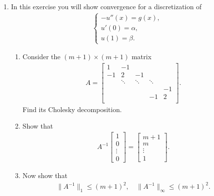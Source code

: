 \documentclass[10pt]{amsart}
\begin{document}
\mline
\begin{enumerate}[label={\bf Problem~{\arabic*}:}]
\item In this exercise you will show convergence for a discretization of
  \begin{align*}
    \begin{cases}
      -u''(x) = g(x),\\
      u'(0) = \alpha,\\
      u(1) = \beta.
    \end{cases}
  \end{align*}
  \begin{enumerate}
\item  Consider the $(m+1) \times (m+1)$ matrix
  \begin{align*}
    A = \begin{bmatrix} 1 & -1 \\ -1 & 2 &-1 \\
    & \ddots & \ddots & \ddots \\
    &&&& -1\\
    &&&-1& 2\\
  \end{bmatrix}.
    \end{align*}
    Find its Cholesky decomposition.
  \item Show that
    \begin{align}\label{unit} A^{-1} \begin{bmatrix}  1 \\ 0 \\ \vdots \\ 0 \end{bmatrix} = \begin{bmatrix}  m +1 \\ m \\ \vdots \\ 1 \end{bmatrix}.\end{align}
  \item Now show that
    \begin{align*}
      \|A^{-1}\|_1 \leq (m+1)^2, \quad \|A^{-1}\|_\infty \leq (m+1)^2.
    \end{align*}
  \end{enumerate}
\mline
  

\end{enumerate}
\end{document}
